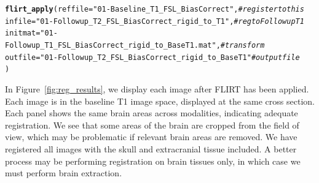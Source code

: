 \documentclass[a4paper]{report}\usepackage[]{graphicx}\usepackage[]{color}
\makeatletter
\newcommand{\hlstr}[1]{\textcolor[rgb]{0.192,0.494,0.8}{#1}}%
\newcommand{\hlcom}[1]{\textcolor[rgb]{0.678,0.584,0.686}{\textit{#1}}}%
\newcommand{\hlstd}[1]{\textcolor[rgb]{0.345,0.345,0.345}{#1}}%
\newcommand{\hlkwc}[1]{\textcolor[rgb]{0.333,0.667,0.333}{#1}}%
\newcommand{\hlkwd}[1]{\textcolor[rgb]{0.737,0.353,0.396}{\textbf{#1}}}%
\newenvironment{kframe}{%
 \def\at@end@of@kframe{}%
 \ifinner\ifhmode%
  \def\at@end@of@kframe{\end{minipage}}%
  \begin{minipage}{\columnwidth}%
 \fi\fi%
 \def\FrameCommand##1{\hskip\@totalleftmargin \hskip-\fboxsep
 \colorbox{shadecolor}{##1}\hskip-\fboxsep
     \hskip-\linewidth \hskip-\@totalleftmargin \hskip\columnwidth}%
 \MakeFramed {\advance\hsize-\width
   \@totalleftmargin\z@ \linewidth\hsize
   \@setminipage}}%
 {\par\unskip\endMakeFramed%
 \at@end@of@kframe}
\newenvironment{knitrout}{}{} %
\makeatother
\begin{document}
\begin{article}
\begin{knitrout}
\color{fgcolor}\begin{kframe}
\begin{alltt}
\hlkwd{flirt_apply}\hlstd{(}\hlkwc{reffile} \hlstd{=} \hlstr{"01-Baseline_T1_FSL_BiasCorrect"}\hlstd{,} \hlcom{# register to this}
            \hlkwc{infile} \hlstd{=} \hlstr{"01-Followup_T2_FSL_BiasCorrect_rigid_to_T1"}\hlstd{,} \hlcom{# reg to Followup T1}
            \hlkwc{initmat} \hlstd{=} \hlstr{"01-Followup_T1_FSL_BiasCorrect_rigid_to_BaseT1.mat"}\hlstd{,} \hlcom{#transform}
            \hlkwc{outfile} \hlstd{=} \hlstr{"01-Followup_T2_FSL_BiasCorrect_rigid_to_BaseT1"} \hlcom{# output file}
            \hlstd{)}
\end{alltt}
\end{kframe}
\end{knitrout}



In Figure~\ref{fig:reg_results}, we display each image after FLIRT has been applied.  Each image is in the baseline T1 image space, displayed at the same cross section.  Each panel shows the same brain areas across modalities, indicating adequate registration.  We see that some areas of the brain are cropped from the field of view, which may be problematic if relevant brain areas are removed.  We have registered all images with the skull and extracranial tissue included.  A better process may be performing registration on brain tissues only, in which case we must perform brain extraction.


\end{article}
\end{document}

